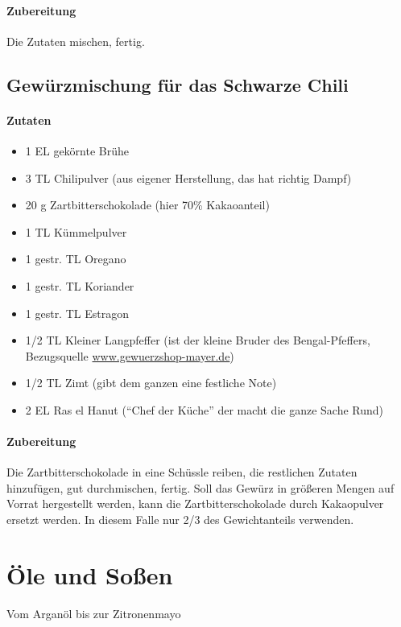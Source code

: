 \paragraph{Zubereitung}

Die Zutaten mischen, fertig.

\subsection{Gewürzmischung für das Schwarze Chili}\label{Gewürzmischung}

\paragraph{Zutaten}

\begin{itemize}[noitemsep]
	\item 1 EL gekörnte Brühe
	\item 3 TL Chilipulver (aus eigener Herstellung, das hat richtig Dampf)
	\item 20 g Zartbitterschokolade (hier 70\% Kakaoanteil)
	\item 1 TL Kümmelpulver
	\item 1 gestr. TL Oregano
	\item 1 gestr. TL Koriander
	\item 1 gestr. TL Estragon
	\item 1/2 TL Kleiner Langpfeffer (ist der kleine Bruder des Bengal-Pfeffers, Bezugsquelle \url{www.gewuerzshop-mayer.de})
	\item 1/2 TL Zimt (gibt dem ganzen eine festliche Note)
	\item 2 EL Ras el Hanut ("`Chef der Küche"' der macht die ganze Sache Rund)
\end{itemize}

\paragraph{Zubereitung}

Die Zartbitterschokolade in eine Schüssle reiben, die restlichen Zutaten 
hinzufügen, gut durchmischen, fertig. Soll das Gewürz in größeren Mengen auf 
Vorrat hergestellt werden, kann die Zartbitterschokolade durch Kakaopulver 
ersetzt werden. In diesem Falle nur 2/3 des  Gewichtanteils verwenden.

\section{Öle und Soßen}
{Vom Arganöl bis zur Zitronenmayo}

